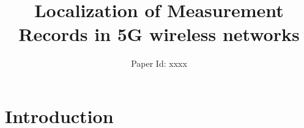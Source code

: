 \documentclass[conference, 10pt]{IEEEtran}
\title{Localization of Measurement Records in 5G wireless networks}
\author{Paper Id: xxxx}
\begin{document}
\maketitle


\begin{abstract}


\end{abstract}


\section{Introduction}


\end{document}
